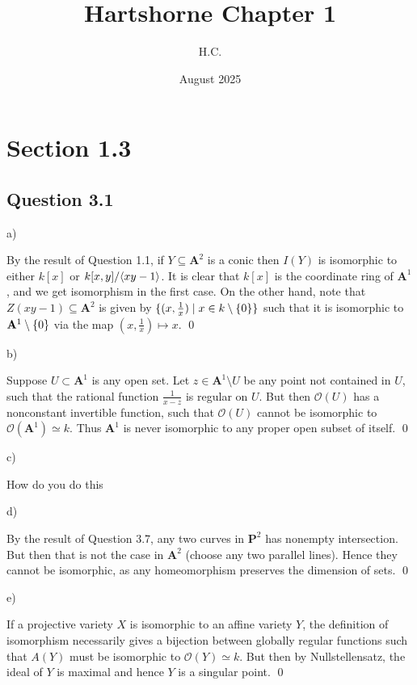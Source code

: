 \documentclass{article}
\title{Hartshorne Chapter 1}
\author{H.C.}
\date{August 2025}
\begin{document}
\maketitle

\section*{Section 1.3}
\subsection*{Question 3.1}

\noindent a)

By the result of Question 1.1, if $Y \subseteq \mathbf{A}^2$ is a conic then $I(Y)$ is isomorphic to either $k[x]$ or $k[x,y]/\langle xy-1\rangle$. It is clear that $k[x]$ is the coordinate ring of $\mathbf{A}^1$, and we get isomorphism in the first case. On the other hand, note that $Z(xy-1) \subseteq \mathbf{A}^2$ is given by $\{(x, \frac{1}{x})\mid x \in k \setminus \{0\}\}$ such that it is isomorphic to $\mathbf{A}^1 \setminus \{0\}$ via the map $(x,\frac{1}{x})\mapsto x$. \qed

\noindent b)

Suppose $U \subset \mathbf{A}^1$ is any open set. Let $z \in \mathbf{A}^1 \setminus U$ be any point not contained in $U$, such that the rational function $\frac{1}{x-z}$ is regular on $U$. But then $\mathcal{O}(U)$ has a nonconstant invertible function, such that $\mathcal{O}(U)$ cannot be isomorphic to $\mathcal{O}(\mathbf{A}^1) \simeq k$. Thus $\mathbf{A}^1$ is never isomorphic to any proper open subset of itself. \qed

\noindent c)

How do you do this

\noindent d)

By the result of Question 3.7, any two curves in $\mathbf{P}^2$ has nonempty intersection. But then that is not the case in $\mathbf{A}^2$ (choose any two parallel lines). Hence they cannot be isomorphic, as any homeomorphism preserves the dimension of sets. \qed

\noindent e)

If a projective variety $X$ is isomorphic to an affine variety $Y$, the definition of isomorphism necessarily gives a bijection between globally regular functions such that $A(Y)$ must be isomorphic to $\mathcal{O}(Y) \simeq k$. But then by Nullstellensatz, the ideal of $Y$ is maximal and hence $Y$ is a singular point. \qed
\lspace
\end{document}
